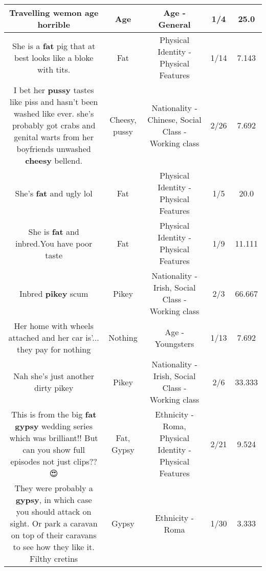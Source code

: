 \documentclass[11pt]{article}
\newlength\mylength
\begin{document}
\begin{center}
\begin{longtable}{|C{.65\mylength}|C{.30\mylength}|C{.12\mylength}|C{.12\mylength}|C{.12\mylength}|}
  \small Travelling wemon \textbf{age} horrible\normalsize   & Age & Age - General & 1/4 & 25.0 \\  \hline
  \small She is a \textbf{fat} pig that at best looks like a bloke with tits.\normalsize   & Fat & Physical Identity - Physical Features & 1/14 & 7.143 \\  \hline
  \small I bet her \textbf{pussy} tastes like piss and hasn't been washed like ever. she's probably got crabs and genital warts from her boyfriends unwashed \textbf{cheesy} bellend.\normalsize   & Cheesy, pussy & Nationality - Chinese, Social Class - Working class & 2/26 & 7.692 \\  \hline
  \small She's \textbf{fat} and ugly lol\normalsize   & Fat & Physical Identity - Physical Features & 1/5 & 20.0 \\  \hline
  \small She is \textbf{fat} and inbred.You have poor taste\normalsize   & Fat & Physical Identity - Physical Features & 1/9 & 11.111 \\  \hline
  \small Inbred \textbf{p\textbf{ikey}} scum\normalsize   & Pikey & Nationality - Irish, Social Class - Working class & 2/3 & 66.667 \\  \hline
  \small Her home with wheels attached and her car is'... they pay for nothing\normalsize   & Nothing & Age - Youngsters & 1/13 & 7.692 \\  \hline
  \small Nah she's just another dirty pikey\normalsize   & Pikey & Nationality - Irish, Social Class - Working class & 2/6 & 33.333 \\  \hline
  \small This is from the big \textbf{fat} \textbf{gypsy} wedding series which was brilliant!!  But can you show full episodes not just clips??😍\normalsize   & Fat, Gypsy & Ethnicity - Roma, Physical Identity - Physical Features & 2/21 & 9.524 \\  \hline
  \small They were probably a \textbf{gypsy}, in which case you should attack on sight. Or park a caravan on top of their caravans to see how they like it. Filthy cretins\normalsize   & Gypsy & Ethnicity - Roma & 1/30 & 3.333 \\  \hline
  

\end{longtable}
\end{center}
\end{document}
